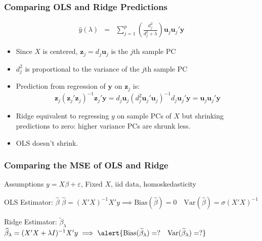 \begin{frame}
  \frametitle{Comparing OLS and Ridge Predictions}
  \small

  \begin{eqnarray*}
  \widehat{y}(\lambda) &=&
   \sum_{j=1}^p   \left( \frac{d_j^2}{d_j^2 + \lambda} \right)\mathbf{u}_j\mathbf{u}_j'\mathbf{y}
  \end{eqnarray*}

  \begin{itemize}
    \item Since $X$ is centered, $\mathbf{z}_j = d_j\mathbf{u}_j$ is the $j$th sample PC
    \item $d_j^2$ is proportional to the \alert{variance} of the $j$th sample PC
    \item Prediction from regression of $\mathbf{y}$ on $\mathbf{z}_j$ is: 
      \[ \mathbf{z}_j(\mathbf{z}_j'\mathbf{z}_j)^{-1}\mathbf{z}_j' \mathbf{y} = 
        d_j \mathbf{u}_j\left( d_j^2 \mathbf{u}_j' \mathbf{u}_j \right)^{-1} d_j \mathbf{u}_j'\mathbf{y} = \mathbf{u}_j\mathbf{u}_j'\mathbf{y}  
      \]
    \item Ridge equivalent to regressing $y$ on sample PCs of $X$ but shrinking predictions to zero: higher variance PCs are shrunk less.
    \item OLS doesn't shrink.
  \end{itemize}

\end{frame}
\begin{frame}
  \frametitle{Comparing the MSE of OLS and Ridge}

  \begin{block}{Assumptions}
    $y = X\beta + \varepsilon$, Fixed $X$, iid data, homoskedasticity
  \end{block}

  \begin{block}{OLS Estimator: $\widehat{\beta}$} 
    $\widehat{\beta} = (X'X)^{-1}X'y \implies \text{Bias}(\widehat{\beta}) = 0 \quad \text{Var}(\widehat{\beta}) = \sigma (X'X)^{-1}$
  \end{block}

  \begin{block}{Ridge Estimator: $\widetilde{\beta}_\lambda$}
    $\widehat{\beta}_\lambda = (X'X + \lambda I)^{-1}X'y \implies \alert{\text{Bias}(\widetilde{\beta}_\lambda) = ? \quad\text{Var}(\widetilde{\beta}_\lambda) = ?}$ 
  \end{block}

\end{frame}
